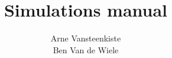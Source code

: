 \documentclass[a4paper, twoside]{article}
\newcommand{\doctitle}{Simulations manual}
\begin{document}
\hypersetup{breaklinks=true}
\setlength{\parindent}{0cm}

\title{\doctitle}
\author{Arne Vansteenkiste\\Ben Van de Wiele}
\maketitle


\tableofcontents




\appendix


%

\printindex
\end{document}

